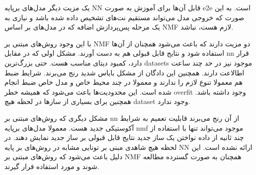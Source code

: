یک مزیت دیگر مدل‌های برپایه \gls{NN} قابل آن‌ها برای آموزش به صورت \gls{e2e}
است. به این صورت که خروجی مدل می‌تواند مستقیم نت‌های تشخیص داده شده باشد و نیازی
به یک مرحله پس‌پردازش اضافه که در مدل‌های بر اساس \gls{NMF} لازم هست، نباشد.

با این وجود روش‌های مبتنی بر \gls{NMF} دو مزیت دارند که باعث می‌شود همچنان از
آن‌ها استفاده شود و نتایج قابل قبولی هم به دست آورند. مشکل اولی که در مقابل
\gls{nn} قرار دارد، کمبود دیتای مناسب هست. حتی بزرگ‌ترین \glspl{dataset} موجود
نیز در حد چند ساعت اطالاعت دارند. همچنین این دادگان از مشکل بایاس شدید رنج
می‌برند. شرایط ضبط هم معمولا تنوع لازم را ندارند و معمولا در چند محیط خاص و مدل
خاص ضبط انجام شده است. این محدودیت‌ها باعث می‌شود که همیشه خطر \gls{overfit}
وجود داشته باشد. همچنین برای بسیاری از سازها در لحظه هیچ \gls{dataset} وجود
ندارد.

مشکل دیگری که روش‌های مبتنی بر \gls{nn} از آن رنج می‌برند قابلیت تعمیم به شرایط
آکوستیکی جدید هست. معمولا مدل‌های برپایه \gls{nmf} موجود می‌تواند تنها با
استفاده از چند ثانیه از داده نواختن یک ساز جدید نتایج قابل قبولی بر ساز جدید
نمایش دهند. در لحظه هیچ شاهدی مبنی بر تونایی مشابه در روش‌های بر پایه \gls{NN}
ارائه نشده است. این دلیل باعث می‌شود که روش‌های مبتنی بر \gls{NMF} همچنان به
صورت گسترده مطالعه شوند و مورد استفاده قرار گیرند.